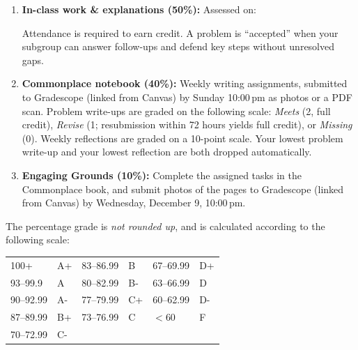 \documentclass[oneside,11pt]{amsart}
\begin{document}
\begin{enumerate}[$\bullet$]
\item \textbf{In-class work \& explanations (50\%):}
Assessed on:
Attendance is required to earn credit. A problem is ``accepted'' when your subgroup can answer follow-ups and defend key steps without unresolved gaps.

 \item \textbf{Commonplace notebook (40\%):}
	Weekly writing assignments, submitted to Gradescope (linked from
	Canvas) by Sunday 10:00\,pm as photos or a PDF scan.
	Problem write-ups are graded on the following scale:
	\emph{Meets} (2, full credit),
	\emph{Revise}
	(1; resubmission within 72 hours yields full credit), or
	\emph{Missing} (0).
	Weekly reflections are graded on a 10-point scale.
	Your lowest problem write-up and your lowest reflection
	are both dropped automatically.

	\item \textbf{Engaging Grounds (10\%):}
	Complete the assigned tasks in the Commonplace book, and
	submit photos of the pages to Gradescope (linked from Canvas) by
	Wednesday, December 9,
	10:00\,pm.
\end{enumerate}

The percentage grade is \emph{not rounded up}, and is calculated
according to the following scale:
\begin{center}
\begin{tabular}{ll|ll|ll}
100+ & A+ & 83--86.99 & B & 67--69.99 & D+ \\
93--99.9 & A & 80--82.99 & B- & 63--66.99 & D \\
90--92.99 & A- & 77--79.99 & C+ & 60--62.99 & D- \\
87--89.99 & B+ & 73--76.99 & C & $<60$ & F \\
70--72.99 & C- & & \\
\end{tabular}
\end{center}
\end{document}
